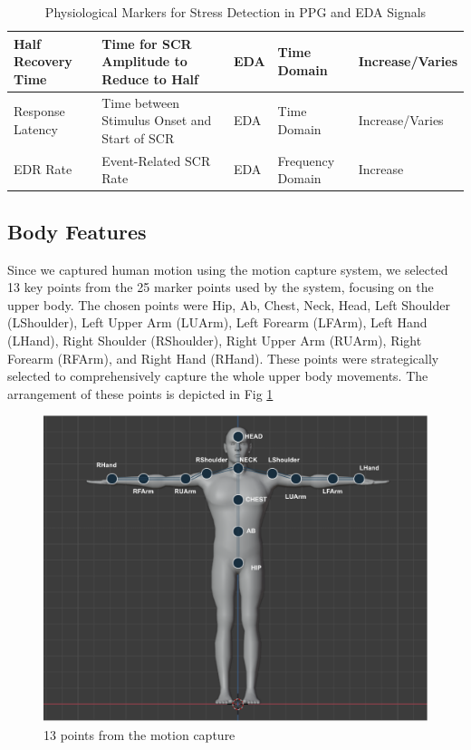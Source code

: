 \begin{table}[h]
{\begin{tabular}{|l|p{4cm}|l|l|l|}
  Half Recovery Time       & Time for SCR Amplitude to Reduce to Half                   & EDA                    & Time Domain     & Increase/Varies                         \\ \hline
  Response Latency         & Time between Stimulus Onset and Start of SCR               & EDA                    & Time Domain     & Increase/Varies                         \\ \hline
  EDR Rate                 & Event-Related SCR Rate                                     & EDA                    & Frequency Domain & Increase                                \\ \hline
  \end{tabular}}
  \caption{Physiological Markers for Stress Detection in PPG and EDA Signals}
  \label{tab:stress_markers}
\end{table}
  
  
  


\subsection{Body Features}
Since we captured human motion using the motion capture system, we selected 13 key points from the 25 marker points used by the system, focusing on the upper body. The chosen points were Hip, Ab, Chest, Neck, Head, Left Shoulder (LShoulder), Left Upper Arm (LUArm), Left Forearm (LFArm), Left Hand (LHand), Right Shoulder (RShoulder), Right Upper Arm (RUArm), Right Forearm (RFArm), and Right Hand (RHand). These points were strategically selected to comprehensively capture the whole upper body movements. The arrangement of these points is depicted in Fig \ref{fig:human1}



\begin{figure}[!htbp]
	\centering
	\includegraphics[width=0.8\columnwidth]{images/humandraw.pdf}
	\caption{13 points from the motion capture} 
	\label{fig:human1}
\end{figure}
